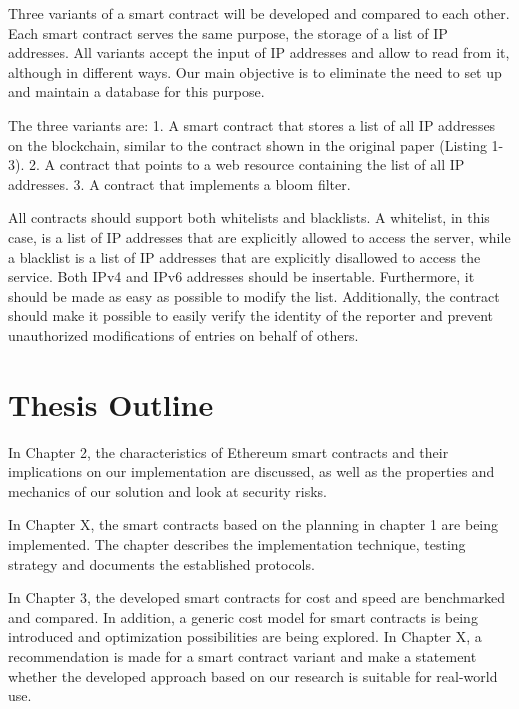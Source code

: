 Three variants of a smart contract will be developed and compared to each other. Each smart contract serves the same purpose, the storage of a list of IP addresses. All variants accept the input of IP addresses and allow to read from it, although in different ways.
Our main objective is to eliminate the need to set up and maintain a database for this purpose.

The three variants are: 1. A smart contract that stores a list of all IP addresses on the blockchain, similar to the contract shown in the original paper \cite{OriginalPaper} (Listing 1-3). 2. A contract that points to a web resource containing the list of all IP addresses. 3. A contract that implements a bloom filter.

All contracts should support both whitelists and blacklists.
A whitelist, in this case, is a list of IP addresses that are explicitly allowed to access the server, while a blacklist is a list of IP addresses that are explicitly disallowed to access the service.
Both IPv4 and IPv6 addresses should be insertable. Furthermore, it should be made as easy as possible to modify the list. Additionally, the contract should make it possible to easily verify the identity of the reporter and prevent unauthorized modifications of entries on behalf of others. 

\section{Thesis Outline}

In Chapter 2, the characteristics of Ethereum smart contracts and their implications on our implementation are discussed, as well as the properties and mechanics of our solution and look at security risks.

In Chapter X, the smart contracts based on the planning in chapter 1 are being implemented. The chapter describes the implementation technique, testing strategy and documents the established protocols.

In Chapter 3, the developed smart contracts for cost and speed are benchmarked and compared. In addition, a generic cost model for smart contracts is being introduced and optimization possibilities are being explored.
In Chapter X, a recommendation is made for a smart contract variant and make a statement whether the developed approach based on our research is suitable for real-world use.
